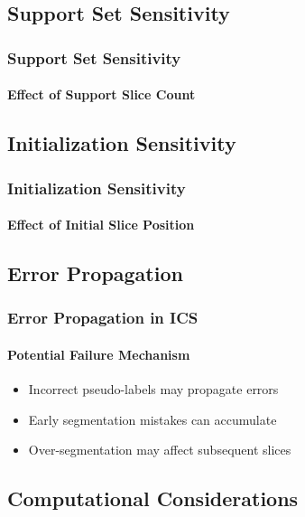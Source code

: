 \documentclass[nometaot,lecture,amberg,autotoc,toc=twocolumn,indicatelastpageofframe,footlinebox]{OTHAWbeamer}
\begin{document}
\subsection{Support Set Sensitivity}

\begin{frame}
    \frametitle{Support Set Sensitivity}
    \framesubtitle{Effect of Support Slice Count}


\end{frame}

\subsection{Initialization Sensitivity}

\begin{frame}
    \frametitle{Initialization Sensitivity}
    \framesubtitle{Effect of Initial Slice Position}


\end{frame}

\subsection{Error Propagation}

\begin{frame}
    \frametitle{Error Propagation in ICS}
    \framesubtitle{Potential Failure Mechanism}

    \begin{itemize}
        \item Incorrect pseudo-labels may propagate errors
        \item Early segmentation mistakes can accumulate
        \item Over-segmentation may affect subsequent slices
    \end{itemize}

    \vspace{1em}


\end{frame}

\subsection{Computational Considerations}
\end{document}
